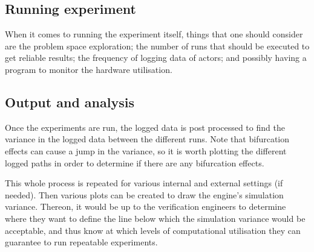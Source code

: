 \subsection{Running experiment}
\noindent When it comes to running the experiment itself, things that one should consider are the problem space exploration; the number of runs that should be executed to get reliable results; the frequency of logging data of actors; and possibly having a program to monitor the hardware utilisation.

\subsection{Output and analysis}
Once the experiments are run, the logged data is post processed to find the variance in the logged data between the different runs. Note that bifurcation effects can cause a jump in the variance, so it is worth plotting the different logged paths in order to determine if there are any bifurcation effects.

This whole process is repeated for various internal and external settings (if needed). 
Then various plots can be created to draw the engine's simulation variance. 
Thereon, it would be up to the verification engineers to determine where they want to define the line below which the simulation variance would be acceptable, and thus know at which levels of computational utilisation they can guarantee to run repeatable experiments.   

